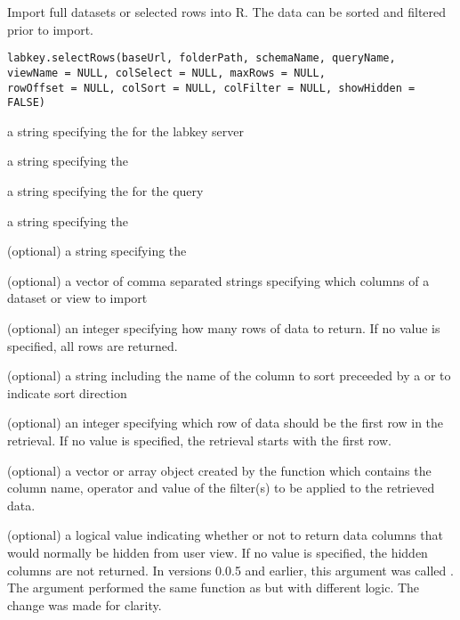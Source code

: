 \documentclass{book}
\begin{document}
\begin{Description}\relax
Import full datasets or selected rows into R. The data can be sorted and filtered prior to import.
\end{Description}
\begin{Usage}
\begin{verbatim}
labkey.selectRows(baseUrl, folderPath, schemaName, queryName, 
viewName = NULL, colSelect = NULL, maxRows = NULL, 
rowOffset = NULL, colSort = NULL, colFilter = NULL, showHidden = FALSE)
\end{verbatim}
\end{Usage}
\begin{Arguments}
\begin{ldescription}
\item[\code{baseUrl}] a string specifying the for the labkey server
\item[\code{folderPath}] a string specifying the  
\item[\code{schemaName}] a string specifying the   for the query
\item[\code{queryName}] a string specifying the 
\item[\code{viewName}] (optional) a string specifying the 
\item[\code{colSelect}] (optional) a vector of comma separated strings specifying which columns of a dataset or view to import
\item[\code{maxRows}] (optional) an integer specifying how many rows of data to return. If no value is specified, all rows are returned.
\item[\code{colSort}] (optional) a string including the name of the column to sort preceeded by a \dQuote{+} or
\dQuote{-} to indicate sort direction
\item[\code{rowOffset}] (optional) an integer specifying which row of data should be the first row in the retrieval. If no
value is specified, the retrieval starts with the first row.
\item[\code{colFilter}] (optional) a vector or array object created by the  function which contains the
column name, operator and value of the filter(s) to be applied to the retrieved data.
\item[\code{showHidden}] (optional) a logical value indicating whether or not to return data columns that would normally be hidden from user view. If no value is specified, the hidden columns are not returned. In versions 0.0.5 and earlier, this argument was called . The  argument performed the same function as  but with different logic. The change was made for clarity.
\end{ldescription}
\end{Arguments}
\end{document}
